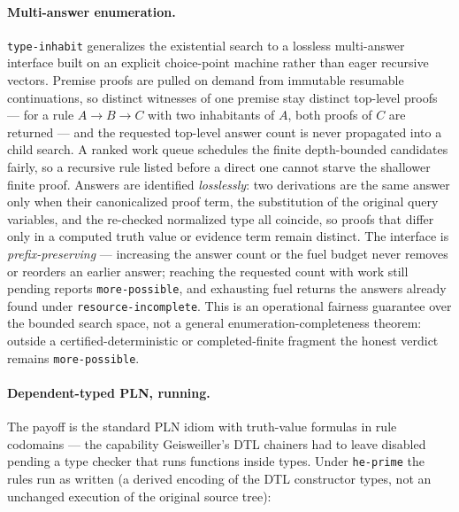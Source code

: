 \documentclass[11pt]{article}
\newcommand{\code}[1]{\texttt{#1}}
\begin{document}
\paragraph{Multi-answer enumeration.}  \code{type-inhabit} generalizes
the existential search to a lossless multi-answer interface built on an
explicit choice-point machine rather than eager recursive vectors.
Premise proofs are pulled on demand from immutable resumable
continuations, so distinct witnesses of one premise stay distinct
top-level proofs --- for a rule $A\to B\to C$ with two inhabitants of
$A$, both proofs of $C$ are returned --- and the requested top-level
answer count is never propagated into a child search.  A ranked work
queue schedules the finite depth-bounded candidates fairly, so a
recursive rule listed before a direct one cannot starve the shallower
finite proof.  Answers are identified \emph{losslessly}: two derivations
are the same answer only when their canonicalized proof term, the
substitution of the original query variables, and the re-checked
normalized type all coincide, so proofs that differ only in a computed
truth value or evidence term remain distinct.  The interface is
\emph{prefix-preserving} --- increasing the answer count or the fuel
budget never removes or reorders an earlier answer; reaching the
requested count with work still pending reports \code{more-possible},
and exhausting fuel returns the answers already found under
\code{resource-incomplete}.  This is an operational fairness guarantee
over the bounded search space, not a general enumeration-completeness
theorem: outside a certified-deterministic or completed-finite fragment
the honest verdict remains \code{more-possible}.

\paragraph{Dependent-typed PLN, running.}  The payoff is the standard
PLN idiom with truth-value formulas in rule codomains --- the
capability Geisweiller's DTL chainers had to leave disabled pending a
type checker that runs functions inside types.  Under \code{he-prime}
the rules run as written (a derived encoding of the DTL constructor
types, not an unchanged execution of the original source tree):
\end{document}
